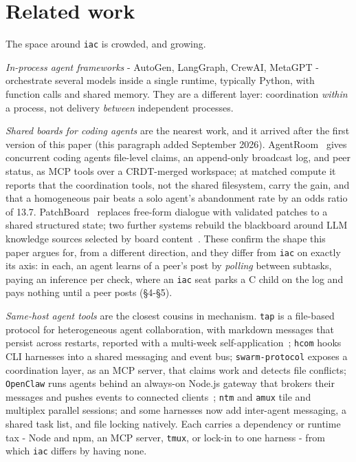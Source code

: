 \documentclass[11pt]{article}
\newcommand{\code}[1]{\texttt{#1}}
\begin{document}
\section{Related work}

The space around \code{iac} is crowded, and growing.

\emph{In-process agent frameworks} - AutoGen, LangGraph, CrewAI, MetaGPT - orchestrate several models inside a single runtime, typically Python, with function calls and shared memory. They are a different layer: coordination \emph{within} a process, not delivery \emph{between} independent processes.

\emph{Shared boards for coding agents} are the nearest work, and it arrived after the first version of this paper (this paragraph added September 2026). AgentRoom~\cite{agentroom} gives concurrent coding agents file-level claims, an append-only broadcast log, and peer status, as MCP tools over a CRDT-merged workspace; at matched compute it reports that the coordination tools, not the shared filesystem, carry the gain, and that a homogeneous pair beats a solo agent's abandonment rate by an odds ratio of 13.7. PatchBoard~\cite{patchboard} replaces free-form dialogue with validated patches to a shared structured state; two further systems rebuild the blackboard around LLM knowledge sources selected by board content~\cite{llmbb1,llmbb2}. These confirm the shape this paper argues for, from a different direction, and they differ from \code{iac} on exactly its axis: in each, an agent learns of a peer's post by \emph{polling} between subtasks, paying an inference per check, where an \code{iac} seat parks a C child on the log and pays nothing until a peer posts (\S4-\S5).

\emph{Same-host agent tools} are the closest cousins in mechanism. \code{tap} is a file-based protocol for heterogeneous agent collaboration, with markdown messages that persist across restarts, reported with a multi-week self-application~\cite{tap}; \code{hcom} hooks CLI harnesses into a shared messaging and event bus; \code{swarm-protocol} exposes a coordination layer, as an MCP server, that claims work and detects file conflicts; \code{OpenClaw} runs agents behind an always-on Node.js gateway that brokers their messages and pushes events to connected clients~\cite{openclaw}; \code{ntm} and \code{amux} tile and multiplex parallel sessions; and some harnesses now add inter-agent messaging, a shared task list, and file locking natively. Each carries a dependency or runtime tax - Node and npm, an MCP server, \code{tmux}, or lock-in to one harness - from which \code{iac} differs by having none.
\end{document}
